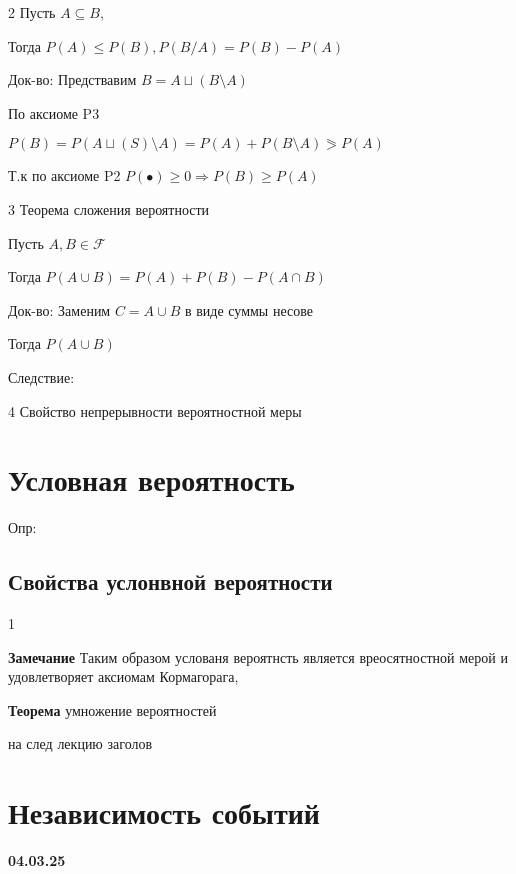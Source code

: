 \documentclass{article}
\begin{document}
2 Пусть $A \subseteq B $,

Тогда $P(A) \leqslant P(B), P(B/A) = P(B) - P(A)$

Док-во: Предствавим $B=A \sqcup (B \setminus  A)$

По аксиоме P3

$P(B) = P(A \sqcup (S) \setminus A ) = P(A)+P(B \setminus A) \eqslantgtr P(A)$

Т.к по аксиоме P2 $P(\bullet ) \geq 0 \Rightarrow P(B) \geq P(A)$

\vspace{5mm}

3 Теорема сложения вероятности

Пусть  $A,B \in \mathcal{F}$

Тогда $P(A\cup B) = P(A) + P(B) - P(A \cap  B)$

Док-во: Заменим $C = A \cup  B$ в виде суммы несове

Тогда $P(A\cup B) $

Следствие:

\vspace{5mm}

4 Свойство непрерывности вероятностной меры



\vspace{5mm}


\section{Условная вероятность}




Опр:




\subsection{Свойства услонвной вероятности}

1 




\textbf{Замечание} Таким образом услованя вероятнсть является вреосятностной мерой 
и удовлетворяет аксиомам Кормагорага,



\textbf{Теорема} умножение вероятностей


на след лекцию заголов

\section{Независимость событий}





\textbf{04.03.25}
\end{document}
